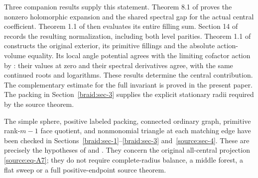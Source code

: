 \documentclass[11pt]{article}
\numberwithin{equation}{section}
\begin{document}
Three companion results supply this statement.
Theorem 8.1 of \cite{CasimirSources} proves the nonzero holomorphic
expansion and the shared spectral gap for the actual central coefficient.
Theorem 1.1 of \cite{OscillatoryFillings} then evaluates its entire
filling sum. Section 14 of \cite{CasimirSources} records the resulting
normalization, including both level parities.
Theorem 1.1 of \cite{MarkedFillings} constructs the original exterior,
its primitive fillings and the absolute action-volume equality.
Its local angle potential agrees with the limiting cofactor action by
\cite[Lemma 5.1]{CasimirSources}: their values at zero and their spectral
derivatives agree, with the same continued roots and logarithms.
These results determine the central contribution. The complementary
estimate for the full invariant is proved in the present paper.
The packing in Section~\ref{braid:sec-3} supplies the explicit
stationary radii required by the source theorem.

The simple sphere, positive labeled packing, connected ordinary graph,
primitive rank-\(m-1\) face quotient, and nonmonomial triangle at each
matching edge have been checked in Sections~\ref{braid:sec-1}--\ref{braid:sec-3} and~\ref{source:sec-4}. These are precisely the
hypotheses of \cite{CasimirSources} and
\cite{MarkedFillings}. They concern the
original all-central projection \eqref{source:eq-A7}; they do not require complete-radius
balance, a middle forest, a flat sweep or a full positive-endpoint
source theorem.
\end{document}
